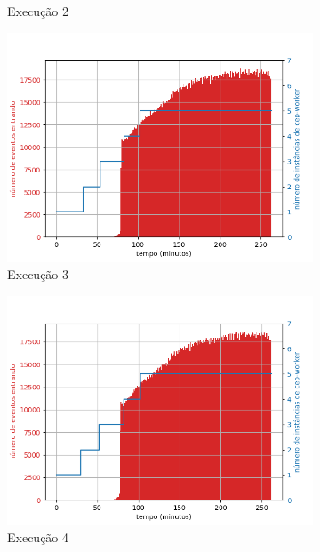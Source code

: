 \begin{figure}[p]
\begin{subfigure}{.5\textwidth}
  \caption{Execução 2}
  \label{fig:cewt-7-dez-su}
\end{subfigure}
\begin{subfigure}{.5\textwidth}
  \centering
  \includegraphics[width=\linewidth]{figuras/graphics/carga_e_workers_total8-dez-su.png}  
  \caption{Execução 3}
  \label{fig:cewt-8-dez-su}
\end{subfigure}
\begin{subfigure}{.5\textwidth}
  \centering
  \includegraphics[width=\linewidth]{figuras/graphics/carga_e_workers_total9-dez-su.png}  
  \caption{Execução 4}
  \label{fig:cewt-9-dez-su}
\end{subfigure}
\begin{subfigure}{.5\textwidth}

\end{subfigure}
\end{figure}
